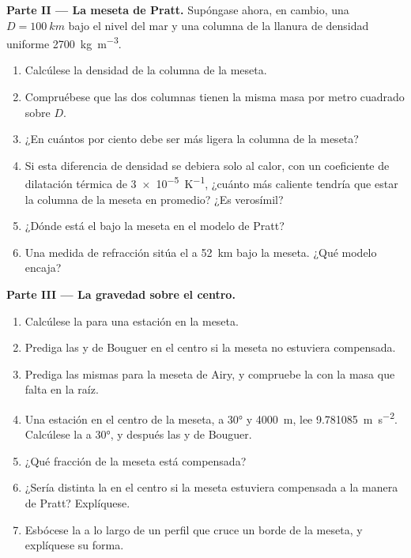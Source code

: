 \begin{problem}
\noindent\textbf{Parte II --- La meseta de Pratt.}
Supóngase ahora, en cambio, una  $D = \qty{100}{km}$ bajo el nivel del mar y una columna de la llanura de
densidad uniforme \qty{2700}{kg.m^{-3}}.
\begin{enumerate}[resume]
  \item Calcúlese la densidad de la columna de la meseta.
  \item Compruébese que las dos columnas tienen la misma masa por metro cuadrado sobre
        $D$.
  \item ¿En cuántos por ciento debe ser más ligera la columna de la meseta?
  \item Si esta diferencia de densidad se debiera solo al calor, con un coeficiente de dilatación térmica de \qty{3e-5}{K^{-1}},
        ¿cuánto más caliente tendría que estar la columna de la meseta en promedio? ¿Es verosímil?
  \item ¿Dónde está el  bajo la meseta en el modelo de Pratt?
  \item Una medida de refracción sitúa el  a \qty{52}{km} bajo la meseta. ¿Qué modelo encaja?
\end{enumerate}

\noindent\textbf{Parte III --- La gravedad sobre el centro.}
\begin{enumerate}[resume]
  \item Calcúlese la  para una estación en la meseta.
  \item Prediga las  y de Bouguer en el centro si la meseta no estuviera compensada.
  \item Prediga las mismas para la meseta de Airy, y compruebe la  con la masa que falta en la raíz.
  \item Una estación en el centro de la meseta, a  \ang{30} y \qty{4000}{m}, lee \qty{9.781085}{m.s^{-2}}. Calcúlese la  a \ang{30}, y después las  y de Bouguer.
  \item ¿Qué fracción de la meseta está compensada?
  \item ¿Sería distinta la  en el centro si la meseta estuviera compensada a la manera de Pratt? Explíquese.
  \item Esbócese la  a lo largo de un perfil que cruce un borde de la meseta, y explíquese su forma.
\end{enumerate}


\end{problem}

